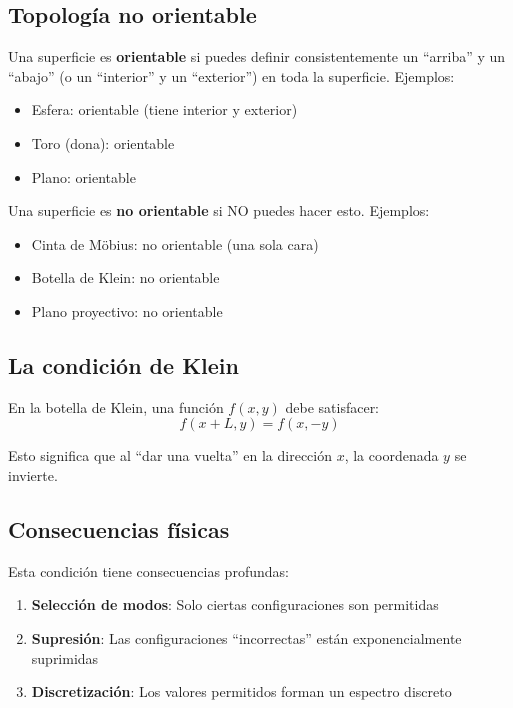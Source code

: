 \documentclass[12pt,a4paper,openany]{book}
\begin{document}
\begin{nivelconceptual}

\section*{Topología no orientable}

Una superficie es \textbf{orientable} si puedes definir consistentemente un ``arriba'' y un ``abajo'' (o un ``interior'' y un ``exterior'') en toda la superficie. Ejemplos:
\begin{itemize}
    \item Esfera: orientable (tiene interior y exterior)
    \item Toro (dona): orientable
    \item Plano: orientable
\end{itemize}

Una superficie es \textbf{no orientable} si NO puedes hacer esto. Ejemplos:
\begin{itemize}
    \item Cinta de Möbius: no orientable (una sola cara)
    \item Botella de Klein: no orientable
    \item Plano proyectivo: no orientable
\end{itemize}

\subsection*{La condición de Klein}

En la botella de Klein, una función $f(x,y)$ debe satisfacer:
\begin{equation}
    f(x + L, y) = f(x, -y)
\end{equation}

Esto significa que al ``dar una vuelta'' en la dirección $x$, la coordenada $y$ se invierte.

\subsection*{Consecuencias físicas}

Esta condición tiene consecuencias profundas:
\begin{enumerate}
    \item \textbf{Selección de modos}: Solo ciertas configuraciones son permitidas
    \item \textbf{Supresión}: Las configuraciones ``incorrectas'' están exponencialmente suprimidas
    \item \textbf{Discretización}: Los valores permitidos forman un espectro discreto
\end{enumerate}

\end{nivelconceptual}
\end{document}
